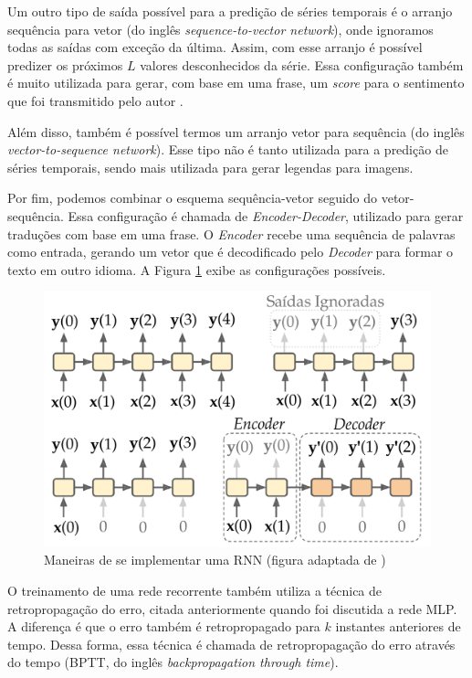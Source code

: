 \documentclass[a4paper, 12pt]{article}
\begin{document}
Um outro tipo de saída possível para a predição de séries temporais é o arranjo sequência para vetor (do inglês \textit{sequence-to-vector network}), onde ignoramos todas as saídas com exceção da última. Assim, com esse arranjo é possível predizer os próximos $L$ valores desconhecidos da série. Essa configuração também é muito utilizada para gerar, com base em uma frase, um \textit{score} para o sentimento que foi transmitido pelo autor \cite{geron2019hands}.

Além disso, também é possível termos um arranjo vetor para sequência (do inglês \textit{vector-to-sequence network}). Esse tipo não é tanto utilizada para a predição de séries temporais, sendo mais utilizada para gerar legendas para imagens. 

Por fim, podemos combinar o esquema sequência-vetor seguido do vetor-sequência. Essa configuração é chamada de \textit{Encoder-Decoder}, utilizado para gerar traduções com base em uma frase. O \textit{Encoder} recebe uma sequência de palavras como entrada, gerando um vetor que é decodificado pelo \textit{Decoder} para formar o texto em outro idioma. A Figura \ref{fig:rnn-output-style} exibe as configurações possíveis.
\begin{figure}[!ht]
\centering
\includegraphics[scale = 0.3]{rnn-output-style.pdf}
\caption{Maneiras de se implementar uma RNN (figura adaptada de \cite{geron2019hands})}
\label{fig:rnn-output-style}
\end{figure}

O treinamento de uma rede recorrente também utiliza a técnica de retropropagação do erro, citada anteriormente quando foi discutida a rede MLP. A diferença é que o erro também é retropropagado para $k$ instantes anteriores de tempo. Dessa forma, essa técnica é chamada de retropropagação do erro através do tempo (BPTT, do inglês \textit{backpropagation through time}).
\end{document}
